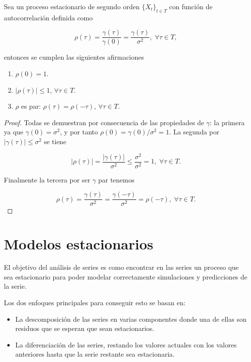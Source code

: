 \begin{proposicion}
  Sea un proceso estacionario de segundo orden $\{X_t\}_{t \in T}$ con función de autocorrelación definida como

  $$\rho(\tau) = \dfrac{\gamma(\tau)}{\gamma(0)} = \dfrac{\gamma(\tau)}{\sigma^2}, \; \forall \tau \in T,$$

  entonces se cumplen las siguientes afirmaciones

  \begin{enumerate}
    \item $\rho(0) = 1$.
    \item $|\rho(\tau)| \leq 1, \, \forall \tau \in T$.
    \item $\rho$ es par: $\rho(\tau) = \rho(-\tau), \, \forall \tau \in T$.
  \end{enumerate}
  \label{prop:propiedades-rho}
\end{proposicion}

\begin{proof}
  Todas se demuestran por consecuencia de las propiedades de $\gamma$: la primera ya que $\gamma(0) = \sigma^2$, y por tanto $\rho(0) = \gamma(0) / \sigma^2 = 1$. La segunda por $|\gamma(\tau)| \leq \sigma^2$ se tiene

  $$|\rho(\tau)| = \dfrac{|\gamma(\tau)|}{\sigma^2} \leq \dfrac{\sigma^2}{\sigma^2} = 1, \; \forall \tau \in T.$$

  Finalmente la tercera por ser $\gamma$ par tenemos

  $$\rho(\tau) = \dfrac{\gamma(\tau)}{\sigma^2} = \dfrac{\gamma(-\tau)}{\sigma^2} = \rho(-\tau), \; \forall \tau \in T.$$
\end{proof}

\section{Modelos estacionarios}

El objetivo del análisis de series es como encontrar en las series un proceso que sea estacionario para poder modelar correctamente simulaciones y predicciones de la serie.

Los dos enfoques principales para conseguir esto se basan en:

\begin{itemize}
  \item La descomposición de las series en varias componentes donde una de ellas son residuos que se esperan que sean estacionarios.
  \item La diferenciación de las series, restando los valores actuales con los valores anteriores hasta que la serie restante sea estacionaria.
\end{itemize}

